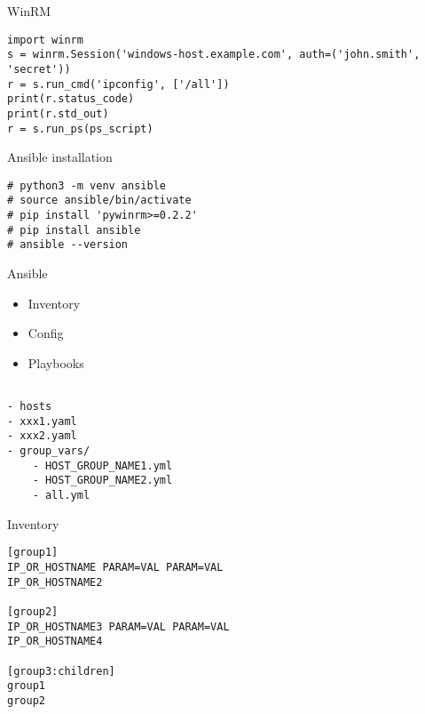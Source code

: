 \documentclass{article}
\begin{document}
\begin{center} WinRM \end{center}
\begin{lstlisting}
import winrm
s = winrm.Session('windows-host.example.com', auth=('john.smith', 'secret'))
r = s.run_cmd('ipconfig', ['/all'])
print(r.status_code)
print(r.std_out)
r = s.run_ps(ps_script)
\end{lstlisting}
\newpage

\begin{center} Ansible installation \end{center}
\begin{lstlisting}
# python3 -m venv ansible
# source ansible/bin/activate
# pip install 'pywinrm>=0.2.2'
# pip install ansible
# ansible --version
\end{lstlisting}
\newpage

\begin{center} Ansible \end{center}
\begin{itemize}
    \item Inventory
    \item Config
    \item Playbooks
\end{itemize}
\begin{verbatim}

- hosts
- xxx1.yaml
- xxx2.yaml
- group_vars/
    - HOST_GROUP_NAME1.yml
    - HOST_GROUP_NAME2.yml
    - all.yml

\end{verbatim}
\newpage

\begin{center} Inventory \end{center}
\vspace{15pt}
\begin{lstlisting}
[group1]
IP_OR_HOSTNAME PARAM=VAL PARAM=VAL
IP_OR_HOSTNAME2 

[group2]
IP_OR_HOSTNAME3 PARAM=VAL PARAM=VAL
IP_OR_HOSTNAME4 

[group3:children]
group1
group2
\end{lstlisting}
\newpage

\end{document}
